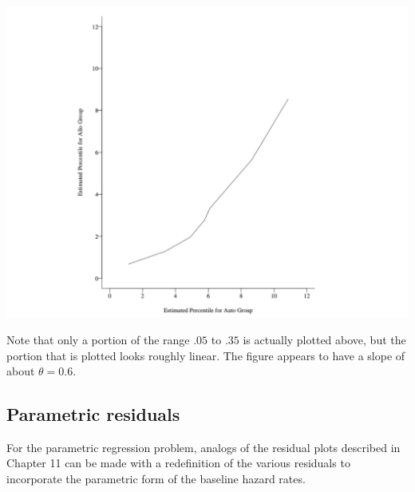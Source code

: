 \documentclass[10pt]{article}\usepackage[]{graphicx}\usepackage[]{xcolor}
\theoremstyle{definition}
\numberwithin{equation}{subsection}
\numberwithin{figure}{section}
\numberwithin{table}{subsection}
\numberwithin{Report}{section}
\numberwithin{Example}{subsection}
\begin{document}
\includegraphics[scale=0.5]{figures/presentation_pic2.pdf}



\noindent Note that only a portion of the range $.05$ to $.35$ is actually
plotted above, but the portion that is plotted looks roughly linear.
The figure appears to have a slope of about $\theta=0.6$.


\subsection{Parametric residuals}

For the parametric regression problem, analogs of the residual plots described in Chapter 11 can be made with a redefinition of the various residuals to incorporate the parametric form of the baseline hazard rates.
\end{document}

